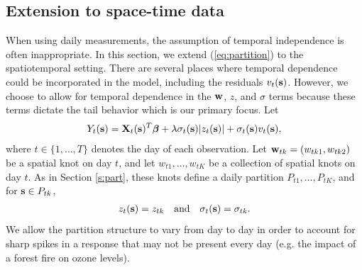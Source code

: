 \documentclass[11pt]{article}
\begin{document}
\subsection{Extension to space-time data} \label{s:temporal}
When using daily measurements, the assumption of temporal independence is often inappropriate.
In this section, we extend (\ref{eq:partition}) to the spatiotemporal setting.
There are several places where temporal dependence could be incorporated in the model, including the residuals $v_t(\mbox{\bf s})$.
However, we choose to allow for temporal dependence in the $\mbox{\bf w}$, $z$, and $\sigma$ terms because these terms dictate the tail behavior which is our primary focus.
Let
\begin{align} \label{eq:spatiotemp}
  Y_t(\mbox{\bf s}) = \mbox{\bf X}_t(\mbox{\bf s})^T \mbox{\boldmath $\beta$} + \lambda \sigma_t(\mbox{\bf s}) |z_t(\mbox{\bf s})| + \sigma_t(\mbox{\bf s}) v_t(\mbox{\bf s}),
\end{align}
where $t \in \{1, \ldots, T\}$ denotes the day of each observation.
Let \hbox{$\mbox{\bf w}_{tk} = (w_{tk1}, w_{tk2})$} be a spatial knot on day $t$, and let $w_{t1}, \ldots, w_{tK}$ be a collection of spatial knots on day $t$.
As in Section \ref{s:part}, these knots define a daily partition $P_{t1}, \ldots, P_{tK}$, and for $\mbox{\bf s} \in P_{tk}$,
\begin{align}
  z_t(\mbox{\bf s}) = z_{tk}\quad \text{and} \quad \sigma_{t}(\mbox{\bf s}) = \sigma_{tk}.
\end{align}
We allow the partition structure to vary from day to day in order to account for sharp spikes in a response that may not be present every day (e.g. the impact of a forest fire on ozone levels).
\end{document}
